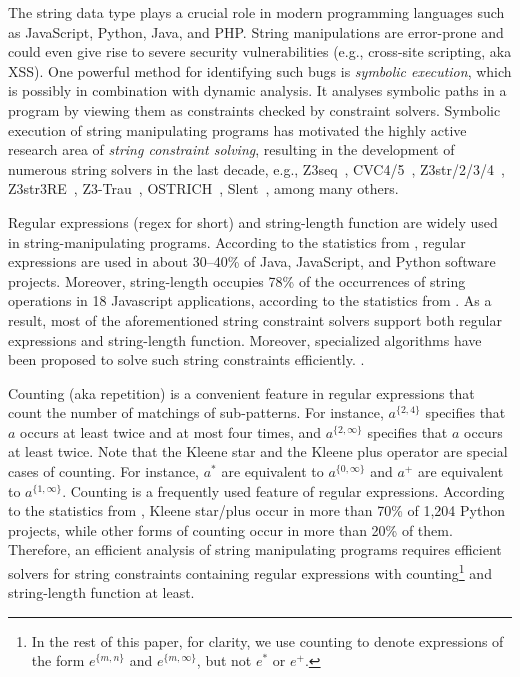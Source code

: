 %

The string data type plays a crucial role in modern programming languages such as JavaScript, Python, Java, and PHP. 
String manipulations are error-prone and could even give rise to severe security vulnerabilities (e.g., cross-site scripting, aka XSS). 
One powerful method for identifying such bugs is \emph{symbolic execution}, which is possibly in combination with dynamic analysis. It analyses symbolic paths in a program by viewing them as constraints checked by constraint solvers. 
%
Symbolic execution of string manipulating programs has motivated the highly active research area of \emph{string constraint solving}, resulting in the development of numerous string solvers in the last decade, e.g.,
Z3seq~\cite{z3seq}, CVC4/5~\cite{cvc4}, Z3str/2/3/4~\cite{Z3-str,Z3-str2,Z3-str3,BerzishMurphy2021}, Z3str3RE~\cite{BD+23}, 
Z3-Trau~\cite{Z3-trau}, OSTRICH~\cite{CHL+19}, Slent~\cite{WC+18}, among many others. 

Regular expressions (regex for short) and string-length function are widely used in string-manipulating programs. According to the statistics from \cite{CS16,DCSL18,WS18}, regular expressions are used in about 30–40\% of Java, JavaScript, and Python software projects. 
Moreover, string-length occupies 78\% of the occurrences of string operations in 18 Javascript applications, according to the statistics from \cite{malware_detection_3_kudzu}. 
As a result, most of the aforementioned string constraint solvers support both regular expressions and string-length function. Moreover, specialized algorithms have been proposed to solve such string constraints efficiently. \cite{LTR+15,BD+23}. 

Counting (aka repetition) is a convenient feature in regular expressions that count the number of matchings of sub-patterns. For instance, $a^{\{2, 4\}}$ specifies that $a$ occurs at least twice and at most four times, and $a^{\{2, \infty\}}$ specifies that $a$ occurs at least twice. 
Note that the Kleene star and the Kleene plus operator are special cases of counting. For instance, $a^*$ are equivalent to $a^{\{0,\infty\}}$ and $a^+$ are equivalent to $a^{\{1,\infty\}}$.
Counting is a frequently used feature of regular expressions. According to the statistics from \cite{CS16}, Kleene star/plus occur in more than 70\% of 1,204 Python projects, while other forms of counting occur in more than 20\% of them. Therefore, an efficient analysis of string manipulating programs requires efficient solvers for string constraints containing regular expressions with counting\footnote{In the rest of this paper, for clarity, we use counting to denote expressions of the form $e^{\{m, n\}}$ and  $e^{\{m, \infty\}}$, but not $e^*$ or $e^+$.} and string-length function at least. 

